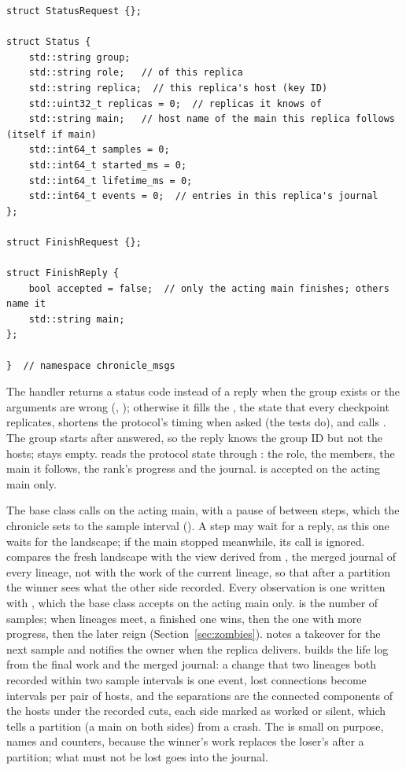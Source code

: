 \begin{lstlisting}[style=paglets-cpp,caption={The chronicle's messages, work and journal entries \src{cpp/examples/chronicle/chronicle\_msgs.hpp}},label={lst:app-chronicle-messages}]
struct StatusRequest {};

struct Status {
    std::string group;
    std::string role;   // of this replica
    std::string replica;  // this replica's host (key ID)
    std::uint32_t replicas = 0;  // replicas it knows of
    std::string main;   // host name of the main this replica follows (itself if main)
    std::int64_t samples = 0;
    std::int64_t started_ms = 0;
    std::int64_t lifetime_ms = 0;
    std::int64_t events = 0;  // entries in this replica's journal
};

struct FinishRequest {};

struct FinishReply {
    bool accepted = false;  // only the acting main finishes; others name it
    std::string main;
};

}  // namespace chronicle_msgs
\end{lstlisting}

The  handler returns a status code instead of a reply when
the group exists or the arguments are wrong (,
); otherwise it fills the , the state
that every checkpoint replicates, shortens the protocol's timing when
asked (the tests do), and calls .
The group starts after  answered, so the reply knows the
group ID but not the hosts;  stays empty.
 reads the protocol state through : the
role, the members, the main it follows, the rank's progress and the
journal.
 is accepted on the acting main only.

The base class calls  on the acting main, with a pause of
 between steps, which the chronicle sets to the sample
interval (). A step may wait for a reply, as this one
waits for the landscape; if the main stopped meanwhile, its
 call is ignored.  compares the fresh
landscape with the view derived from , the merged
journal of every lineage, not with the work of the current lineage, so
that after a partition the winner sees what the other side recorded.
Every observation is one  written with ,
which the base class accepts on the acting main only.  is
the number of samples; when lineages meet, a finished one wins, then the
one with more progress, then the later reign (Section~\ref{sec:zombies}).
 notes a takeover for the next sample and notifies the
owner when the replica delivers.  builds the life log from
the final work and the merged journal: a change that two lineages both
recorded within two sample intervals is one event, lost connections
become intervals per pair of hosts, and the separations are the
connected components of the hosts under the recorded cuts, each side
marked as worked or silent, which tells a partition (a main on both
sides) from a crash. The  is small on purpose, names and
counters, because the winner's work replaces the loser's after a
partition; what must not be lost goes into the journal.
